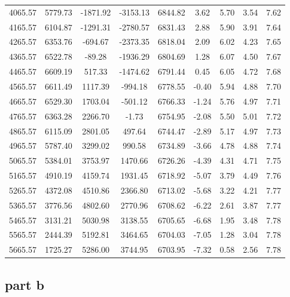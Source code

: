 \begin{center}
\begin{longtable}{|c|c|c|c|c|c|c|c|c|}
    4065.57 & 5779.73 & -1871.92 & -3153.13  & 6844.82 & 3.62 &  5.70 &  3.54 & 7.62 \\ 
    4165.57 & 6104.87 & -1291.31 & -2780.57  & 6831.43 & 2.88 &  5.90 &  3.91 & 7.64 \\ 
    4265.57 & 6353.76 & -694.67 & -2373.35  & 6818.04 & 2.09 &  6.02 &  4.23 & 7.65 \\ 
    4365.57 & 6522.78 & -89.28 & -1936.29  & 6804.69 & 1.28 &  6.07 &  4.50 & 7.67 \\ 
    4465.57 & 6609.19 & 517.33 & -1474.62  & 6791.44 & 0.45 &  6.05 &  4.72 & 7.68 \\ 
    4565.57 & 6611.49 & 1117.39 & -994.18  & 6778.55 & -0.40 &  5.94 &  4.88 & 7.70 \\ 
    4665.57 & 6529.30 & 1703.04 & -501.12  & 6766.33 & -1.24 &  5.76 &  4.97 & 7.71 \\ 
    4765.57 & 6363.28 & 2266.70 & -1.73  & 6754.95 & -2.08 &  5.50 &  5.01 & 7.72 \\ 
    4865.57 & 6115.09 & 2801.05 & 497.64  & 6744.47 & -2.89 &  5.17 &  4.97 & 7.73 \\ 
    4965.57 & 5787.40 & 3299.02 & 990.58  & 6734.89 & -3.66 &  4.78 &  4.88 & 7.74 \\ 
    5065.57 & 5384.01 & 3753.97 & 1470.66  & 6726.26 & -4.39 &  4.31 &  4.71 & 7.75 \\ 
    5165.57 & 4910.19 & 4159.74 & 1931.45  & 6718.92 & -5.07 &  3.79 &  4.49 & 7.76 \\ 
    5265.57 & 4372.08 & 4510.86 & 2366.80  & 6713.02 & -5.68 &  3.22 &  4.21 & 7.77 \\ 
    5365.57 & 3776.56 & 4802.60 & 2770.96  & 6708.62 & -6.22 &  2.61 &  3.87 & 7.77 \\ 
    5465.57 & 3131.21 & 5030.98 & 3138.55  & 6705.65 & -6.68 &  1.95 &  3.48 & 7.78 \\ 
    5565.57 & 2444.39 & 5192.81 & 3464.65  & 6704.03 & -7.05 &  1.28 &  3.04 & 7.78 \\ 
    5665.57 & 1725.27 & 5286.00 & 3744.95  & 6703.95 & -7.32 &  0.58 &  2.56 & 7.78 \\ 
   
    \end{longtable}
    \end{center}

    \subsection{part b}

